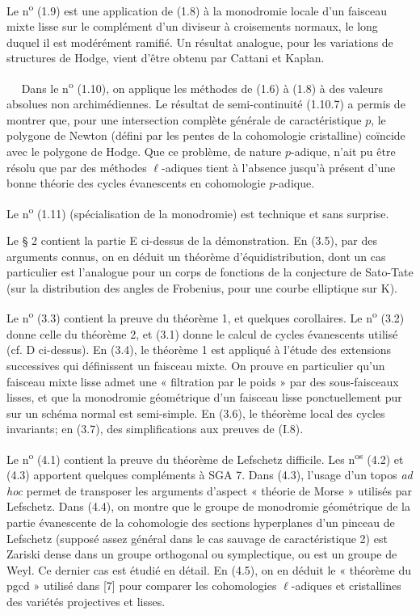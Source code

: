 \documentclass[11pt,leqno]{article}
\newcommand{\Page}[1]{\ifvmode\noindent\else\unskip\ \fi{\footnotesize\textcolor{gray}{[p.\,#1]}}\ \ignorespaces}
\begin{document}
Le n\textsuperscript{o} (1.9) est une application de (1.8) à la monodromie locale d’un faisceau mixte lisse sur le complément d’un diviseur à croisements normaux, le long duquel il est modérément ramifié. Un résultat analogue, pour les variations de structures de Hodge, vient d’être obtenu par Cattani et Kaplan.

\Page{143}
Dans le n\textsuperscript{o} (1.10), on applique les méthodes de (1.6) à (1.8) à des valeurs absolues non archimédiennes. Le résultat de semi-continuité (1.10.7) a permis de montrer que, pour une intersection complète générale de caractéristique \(p\), le polygone de Newton (défini par les pentes de la cohomologie cristalline) coïncide avec le polygone de Hodge. Que ce problème, de nature \(p\)-adique, n’ait pu être résolu que par des méthodes \(\ell\)-adiques tient à l’absence jusqu’à présent d’une bonne théorie des cycles évanescents en cohomologie \(p\)-adique.

Le n\textsuperscript{o} (1.11) (spécialisation de la monodromie) est technique et sans surprise.

Le § 2 contient la partie E ci-dessus de la démonstration. En (3.5), par des arguments connus, on en déduit un théorème d’équidistribution, dont un cas particulier est l’analogue pour un corps de fonctions de la conjecture de Sato-Tate (sur la distribution des angles de Frobenius, pour une courbe elliptique sur \(\mathrm{K}\)).

Le n\textsuperscript{o} (3.3) contient la preuve du théorème 1, et quelques corollaires. Le n\textsuperscript{o} (3.2) donne celle du théorème 2, et (3.1) donne le calcul de cycles évanescents utilisé (cf. D ci-dessus). En (3.4), le théorème 1 est appliqué à l’étude des extensions successives qui définissent un faisceau mixte. On prouve en particulier qu’un faisceau mixte lisse admet une « filtration par le poids » par des sous-faisceaux lisses, et que la monodromie géométrique d’un faisceau lisse ponctuellement pur sur un schéma normal est semi-simple. En (3.6), le théorème local des cycles invariants; en (3.7), des simplifications aux preuves de (I.8).

Le n\textsuperscript{o} (4.1) contient la preuve du théorème de Lefschetz difficile. Les n\textsuperscript{os} (4.2) et (4.3) apportent quelques compléments à SGA 7. Dans (4.3), l’usage d’un topos \textit{ad hoc} permet de transposer les arguments d’aspect « théorie de Morse » utilisés par Lefschetz. Dans (4.4), on montre que le groupe de monodromie géométrique de la partie évanescente de la cohomologie des sections hyperplanes d’un pinceau de Lefschetz (supposé assez général dans le cas sauvage de caractéristique 2) est Zariski dense dans un groupe orthogonal ou symplectique, ou est un groupe de Weyl. Ce dernier cas est étudié en détail. En (4.5), on en déduit le « théorème du pgcd » utilisé dans [7] pour comparer les cohomologies \(\ell\)-adiques et cristallines des variétés projectives et lisses.
\end{document}
